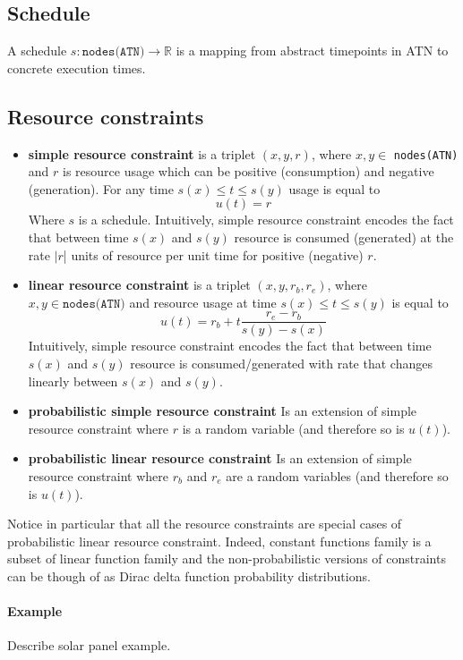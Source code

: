 \documentclass{article}
\begin{document}
\begin{multicols}{2}
\subsection{Schedule}
A schedule $s: \texttt{nodes(ATN)} \rightarrow \mathbb{R}$ is a mapping from abstract timepoints in ATN to concrete execution times.
\subsection{Resource constraints}
\begin{itemize}
\item \textbf{simple resource constraint} is a triplet $(x, y, r)$, where $x, y \in$ \texttt{nodes(ATN)} and $r$ is resource usage which can be positive (consumption) and negative (generation). For any time $s(x) \leq t \leq s(y)$ usage is equal to
\[
u(t) = r
\]
Where $s$ is a schedule. Intuitively, simple resource constraint encodes the fact that between time $s(x)$ and $s(y)$  resource is consumed (generated) at the rate $|r$| units of resource per unit time for positive (negative) $r$.
\item \textbf{linear resource constraint} is a triplet $(x, y, r_b, r_e)$, where $x, y \in \texttt{nodes(ATN)}$ and resource usage at time $s(x) \leq t \leq s(y)$ is equal to
\[
    u(t) = r_b + t  \frac{r_e - r_b}{s(y) - s(x)}
\]
Intuitively, simple resource constraint encodes the fact that between time $s(x)$ and $s(y)$  resource is consumed/generated with rate that changes linearly between $s(x)$ and $s(y)$.
\item \textbf{probabilistic simple resource constraint}
Is an extension of simple resource constraint where $r$ is a random variable (and therefore so is $u(t)$).
\item \textbf{probabilistic linear resource constraint}
Is an extension of simple resource constraint where $r_b$ and $r_e$ are a random variables (and therefore so is $u(t)$).
\end{itemize}
Notice in particular that all the resource constraints are special cases of probabilistic linear resource constraint. Indeed, constant functions family is a subset of linear function family and the non-probabilistic versions of constraints can be though of as Dirac delta function probability distributions.

\paragraph{Example} Describe solar panel example.



\end{multicols}
\end{document}
